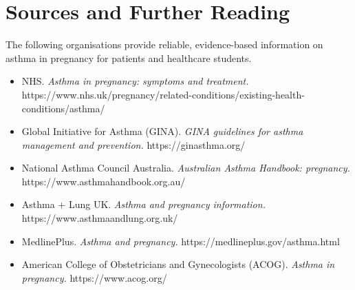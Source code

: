 \section*{Sources and Further Reading}
The following organisations provide reliable, evidence-based information on asthma in pregnancy for patients and healthcare students.

\begin{itemize}
    \item NHS. \textit{Asthma in pregnancy: symptoms and treatment.} https://www.nhs.uk/pregnancy/related-conditions/existing-health-conditions/asthma/
    \item Global Initiative for Asthma (GINA). \textit{GINA guidelines for asthma management and prevention.} https://ginasthma.org/
    \item National Asthma Council Australia. \textit{Australian Asthma Handbook: pregnancy.} https://www.asthmahandbook.org.au/
    \item Asthma + Lung UK. \textit{Asthma and pregnancy information.} https://www.asthmaandlung.org.uk/
    \item MedlinePlus. \textit{Asthma and pregnancy.} https://medlineplus.gov/asthma.html
    \item American College of Obstetricians and Gynecologists (ACOG). \textit{Asthma in pregnancy.} https://www.acog.org/
\end{itemize}
